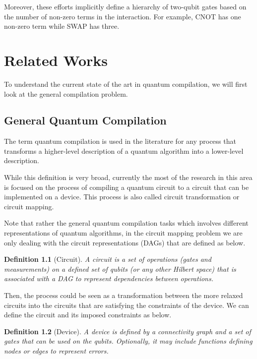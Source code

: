 \documentclass{report}
\newtheorem{definition}{Definition}
\begin{document}
Moreover, these efforts implicitly define a hierarchy of two-qubit gates based on the number of non-zero terms in the interaction. For example, CNOT has one non-zero term while SWAP has three.

\chapter{Related Works}\label{chap:related_works}

To understand the current state of the art in quantum compilation, we will first look at the general compilation problem. 

\section{General Quantum Compilation}


The term quantum compilation is used in the literature for any process that transforms a higher-level description of a quantum algorithm into a lower-level description.~\cite{hundt2022} 

While this definition is very broad, currently the most of the research in this area is focused on the process of compiling a quantum circuit to a circuit that can be implemented on a device. This process is also called circuit transformation or circuit mapping.

Note that rather the general quantum compilation tasks which involves different representations of quantum algorithms, in the circuit mapping problem we are only dealing with the circuit representations (DAGs) that are defined as below.

\begin{definition}[Circuit]
  A circuit is a set of operations (gates and measurements) on a defined set of qubits (or any other Hilbert space) that is associated with a DAG to represent dependencies between operations.
\end{definition}

Then, the process could be seen as a transformation between the more relaxed circuits into the circuits that are satisfying the constraints of the device. We can define the circuit and its imposed constraints as below.

\begin{definition}[Device]
  A device is defined by a connectivity graph and a set of gates that can be used on the qubits. Optionally, it may include functions defining nodes or edges to represent errors.
\end{definition}
\end{document}
